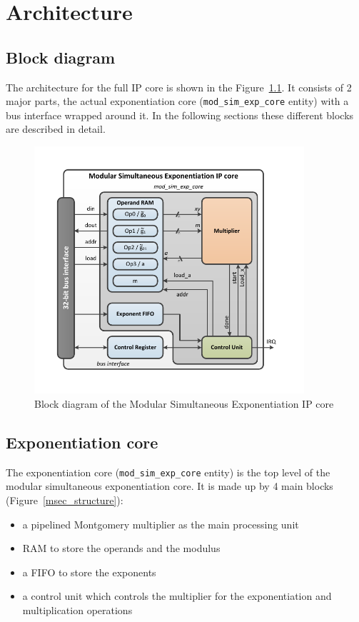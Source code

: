 \chapter{Architecture}

\section{Block diagram}
The architecture for the full IP core is shown in the Figure~\ref{blockdiagram}. It consists of 2 major parts, the actual
exponentiation core (\verb|mod_sim_exp_core| entity) with a bus interface wrapped around it. In the following sections these 
different blocks are described in detail.\\
\begin{figure}[H]
\centering
\includegraphics[trim=1.2cm 1.2cm 1.2cm 1.2cm, width=10cm]{pictures/block_diagram.pdf}
\caption{Block diagram of the Modular Simultaneous Exponentiation IP core}
\label{blockdiagram}
\end{figure}
\newpage

\section{Exponentiation core}
The exponentiation core (\verb|mod_sim_exp_core| entity) is the top level of the modular simultaneous exponentiation
core. It is made up by 4 main blocks (Figure~\ref{msec_structure}):\\

\begin{itemize}
	\item a pipelined Montgomery multiplier as the main processing unit
	\item RAM to store the operands and the modulus
	\item a FIFO to store the exponents
	\item a control unit which controls the multiplier for the exponentiation and multiplication operations
\end{itemize}

